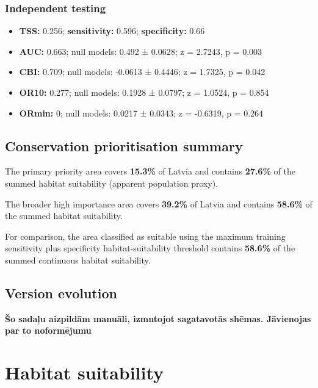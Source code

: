 \documentclass[
  openany]{book}
\providecommand{\tightlist}{%
  \setlength{\itemsep}{0pt}\setlength{\parskip}{0pt}}
\providecommand{\tightlist}{%
  \setlength{\itemsep}{0pt}%
  \setlength{\parskip}{0pt}%
}
\begin{document}
\subsubsection*{Independent testing}\label{independent-testing-26}

\begin{itemize}
\tightlist
\item
  \textbf{TSS:} 0.256; \textbf{sensitivity:} 0.596; \textbf{specificity:} 0.66
\item
  \textbf{AUC:} 0.663; null models: 0.492 ± 0.0628; z = 2.7243, p = 0.003
\item
  \textbf{CBI:} 0.709; null models: -0.0613 ± 0.4446; z = 1.7325, p = 0.042
\item
  \textbf{OR10:} 0.277; null models: 0.1928 ± 0.0797; z = 1.0524, p = 0.854
\item
  \textbf{ORmin:} 0; null models: 0.0217 ± 0.0343; z = -0.6319, p = 0.264
\end{itemize}

\subsection*{Conservation prioritisation summary}\label{conservation-prioritisation-summary-27}

The primary priority area covers \textbf{15.3\%} of Latvia and contains \textbf{27.6\%} of the summed habitat suitability (apparent population proxy).

The broader high importance area covers \textbf{39.2\%} of Latvia and contains \textbf{58.6\%} of the summed habitat suitability.

For comparison, the area classified as suitable using the maximum training sensitivity plus specificity habitat-suitability threshold contains \textbf{58.6\%} of the summed continuous habitat suitability.

\subsection*{Version evolution}\label{version-evolution-27}

\textbf{Šo sadaļu aizpildām manuāli, izmntojot sagatavotās shēmas. Jāvienojas par to noformējumu}

\section*{Habitat suitability}\label{habitat-suitability-27}
\end{document}
